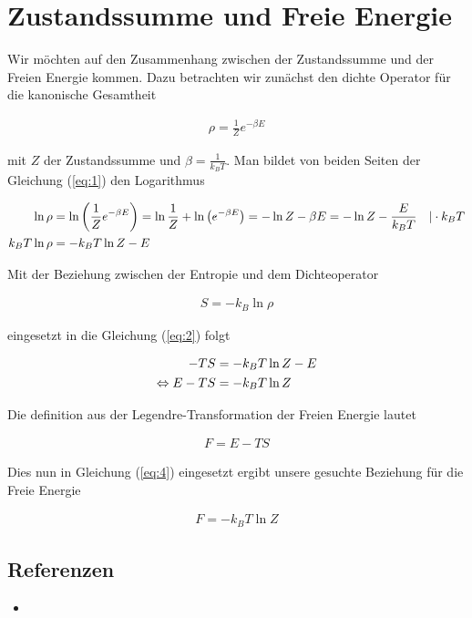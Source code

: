 
\usepackage{amsmath} 





\section*{Zustandssumme und Freie Energie}

Wir möchten auf den Zusammenhang zwischen der Zustandssumme und der Freien Energie kommen. Dazu betrachten wir zunächst den dichte Operator für die kanonische Gesamtheit

\begin{align}
  \label{eq:1}
  \rho = \frac{1}{Z}e^{-\beta E}
\end{align}

mit \(Z\) der Zustandssumme und \(\beta=\frac{1}{k_B T}\). Man bildet von beiden Seiten der Gleichung (\ref{eq:1}) den Logarithmus

\begin{align}
  \label{eq:2}
  \ln \rho &= \ln\left( \frac{1}{Z}e^{-\beta E} \right) = \ln\frac{1}{Z} + \ln\left( e^{-\beta E}\right) = - \ln Z -\beta E =  - \ln Z - \frac{E}{k_B T} \quad | \cdot k_B T \notag \\
k_B T \ln \rho &=   - k_B T \ln Z - E
\end{align}

Mit der Beziehung zwischen der Entropie und dem Dichteoperator

\begin{align}
  \label{eq:3}
  S = -k_B \ln\rho
\end{align}

eingesetzt in die Gleichung (\ref{eq:2}) folgt

\begin{align}
  \label{eq:4}
  -TS &=  - k_B T \ln Z - E \notag \\
\Leftrightarrow E - TS &=  - k_B T \ln Z
\end{align}

Die definition aus der Legendre-Transformation der Freien Energie lautet

\begin{align}
  \label{eq:5}
  F = E - TS
\end{align}

Dies nun in Gleichung (\ref{eq:4}) eingesetzt ergibt unsere gesuchte Beziehung für die Freie Energie

\begin{align}
  \label{eq:6}
\boxed{  F =  - k_B T \ln Z }
\end{align}







\subsection*{Referenzen}
\begin{itemize}
\item 
\end{itemize}


